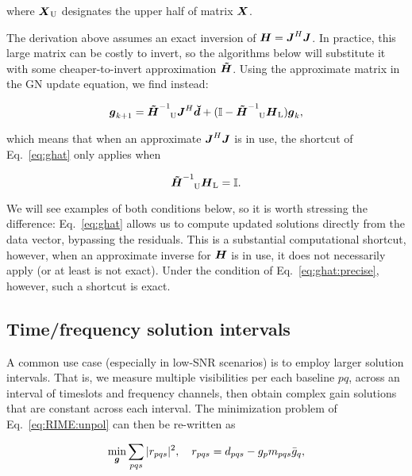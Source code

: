 \documentclass[useAMS,usenatbib]{mn2e}
\newcommand{\II}{\mathbb{I}}
\newcommand{\vecg}{\bmath{g}}
\newcommand{\mat}[1]{{\bmath{#1}}}
\newcommand{\JJ}{\mat{J}} %
\newcommand{\HH}{\mat{H}} %
\newcommand{\HHa}{\mat{\tilde{H}}} %
\newcommand{\JHJ}{\JJ^H\JJ} %
\newcommand{\AUG}[1]{\bmath{\breve{#1}}}
\newcommand{\Dd}{\AUG{d}}
\newcommand{\TOP}{\mathrm{U}}%
\newcommand{\LEFT}{\mathrm{L}}
\begin{document}
where $\bmath{X}_\TOP$ designates the upper half of matrix $\bmath{X}$. 

The derivation above assumes an exact inversion of $\HH=\JHJ$. In practice, this large matrix can be costly to invert, 
so the algorithms below will substitute it with some cheaper-to-invert approximation $\HHa$. Using the approximate
matrix in the GN update equation, we find instead:

\begin{equation}
\label{eq:ghat:approx}
\vecg_{k+1} = \HHa^{-1}_{~~~\TOP} \JJ^H \Dd + (\II - \HHa^{-1}_{~~~\TOP} \HH_\LEFT )\vecg_k,
\end{equation}

which means that when an approximate $\JHJ$ is in use, the shortcut of Eq.~\ref{eq:ghat} only applies when 

\begin{equation}
\label{eq:ghat:precise}
\HHa^{-1}_{~~~\TOP} \HH_\LEFT=\II.
\end{equation}

We will see examples of both conditions below, so it is worth stressing the difference: Eq.~\ref{eq:ghat}
allows us to compute updated solutions directly from the data vector, bypassing the residuals. This is a 
substantial computational shortcut, however, when an approximate inverse for $\HH$ is in use, it 
does not necessarily apply (or at least is not exact). Under the condition of Eq.~\ref{eq:ghat:precise}, however, 
such a shortcut is exact.


\subsection{Time/frequency solution intervals}
\label{sec:unpol:DI:avg}
\label{sec:solution-intervals}

\newcommand{\Ns}{N_s}

A common use case (especially in low-SNR scenarios) is to employ larger solution intervals. 
That is, we measure multiple visibilities per each baseline $pq$, across an interval of timeslots and
frequency channels, then obtain complex gain solutions that are constant across each interval. The 
minimization problem of Eq.~\ref{eq:RIME:unpol} can then be re-written as

\begin{equation}
\label{eq:cal:DI:tf}
\min_{\bmath{g}}\sum_{pqs}|r_{pqs}|^2, 
~~~r_{pqs} = d_{pqs}-g_p m_{pqs} \bar{g}_q, 
\end{equation}
\end{document}
